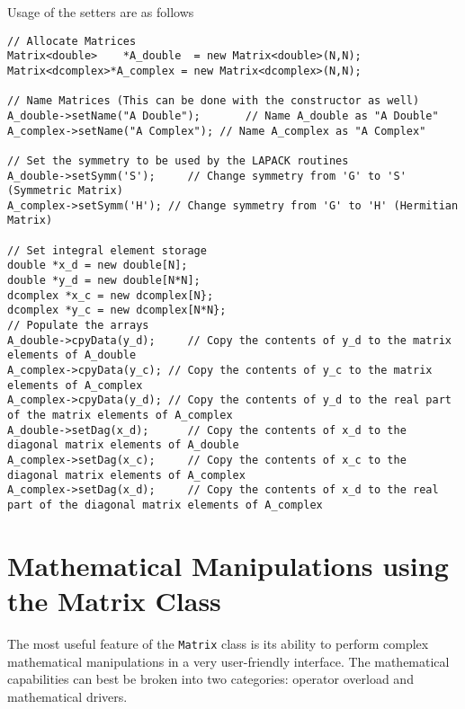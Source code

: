 \documentclass[english,journal=jctcce,manuscript=article,etalmode=truncate,maxauthors=0]{article}
\begin{document}
\newpage
Usage of the setters are as follows
\begin{lstlisting}
// Allocate Matrices
Matrix<double>    *A_double  = new Matrix<double>(N,N); 
Matrix<dcomplex>*A_complex = new Matrix<dcomplex>(N,N);

// Name Matrices (This can be done with the constructor as well)
A_double->setName("A Double");       // Name A_double as "A Double"
A_complex->setName("A Complex"); // Name A_complex as "A Complex"

// Set the symmetry to be used by the LAPACK routines
A_double->setSymm('S');     // Change symmetry from 'G' to 'S' (Symmetric Matrix)
A_complex->setSymm('H'); // Change symmetry from 'G' to 'H' (Hermitian Matrix)

// Set integral element storage
double *x_d = new double[N];
double *y_d = new double[N*N];
dcomplex *x_c = new dcomplex[N};
dcomplex *y_c = new dcomplex[N*N};
// Populate the arrays
A_double->cpyData(y_d);     // Copy the contents of y_d to the matrix elements of A_double
A_complex->cpyData(y_c); // Copy the contents of y_c to the matrix elements of A_complex
A_complex->cpyData(y_d); // Copy the contents of y_d to the real part of the matrix elements of A_complex
A_double->setDag(x_d);      // Copy the contents of x_d to the diagonal matrix elements of A_double
A_complex->setDag(x_c);     // Copy the contents of x_c to the diagonal matrix elements of A_complex
A_complex->setDag(x_d);     // Copy the contents of x_d to the real part of the diagonal matrix elements of A_complex
\end{lstlisting}

\section{Mathematical Manipulations using the Matrix Class}
The most useful feature of the \texttt{Matrix} class is its ability to perform complex mathematical manipulations in a very user-friendly interface. The mathematical capabilities can best be broken into two categories: operator overload and mathematical drivers.
\end{document}
